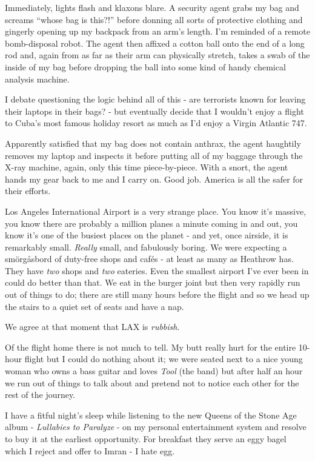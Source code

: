 \documentclass[a5paper,titlepage,11pt]{book}
\begin{document}
Immediately, lights flash and klaxons blare.  A security agent grabs my bag and screams ``whose bag is this?!'' before donning all sorts of protective clothing and gingerly opening up my backpack from an arm's length.  I'm reminded of a remote bomb-disposal robot.  The agent then affixed a cotton ball onto the end of a long rod and, again from as far as their arm can physically stretch, takes a swab of the inside of my bag before dropping the ball into some kind of handy chemical analysis machine.

I debate questioning the logic behind all of this - are terrorists known for leaving their laptops in their bags? - but eventually decide that I wouldn't enjoy a flight to Cuba's most famous holiday resort as much as I'd enjoy a Virgin Atlantic 747.

Apparently satisfied that my bag does not contain anthrax, the agent haughtily removes my laptop and inspects it before putting all of my baggage through the X-ray machine, again, only this time piece-by-piece.  With a snort, the agent hands my gear back to me and I carry on.  Good job.  America is all the safer for their efforts.

Los Angeles International Airport is a very strange place.  You know it's massive, you know there are probably a million planes a minute coming in and out, you know it's one of the busiest places on the planet - and yet, once airside, it is remarkably small.  \emph{Really} small, and fabulously boring.  We were expecting a sm\"{o}rg\r{a}sbord of duty-free shops and caf\'{e}s - at least as many as Heathrow has.  They have \emph{two} shops and \emph{two} eateries.  Even the smallest airport I've ever been in could do better than that.  We eat in the burger joint but then very rapidly run out of things to do; there are still many hours before the flight and so we head up the stairs to a quiet set of seats and have a nap.

We agree at that moment that LAX is \emph{rubbish}.

Of the flight home there is not much to tell.  My butt really hurt for the entire 10-hour flight but I could do nothing about it; we were seated next to a nice young woman who owns a bass guitar and loves \emph{Tool} (the band) but after half an hour we run out of things to talk about and pretend not to notice each other for the rest of the journey.

I have a fitful night's sleep while listening to the new Queens of the Stone Age album - \emph{Lullabies to Paralyze} - on my personal entertainment system and resolve to buy it at the earliest opportunity.  For breakfast they serve an eggy bagel which I reject and offer to Imran - I hate egg.
\end{document}
